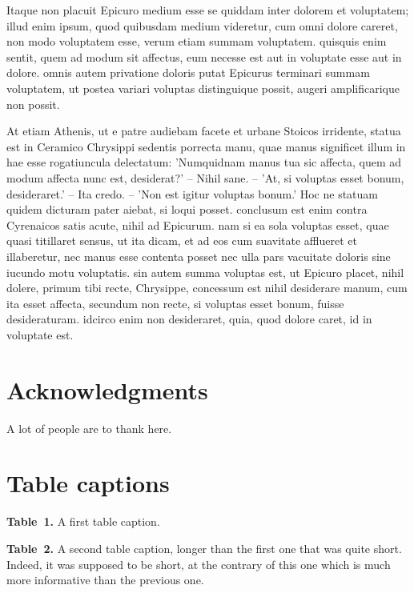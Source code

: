 \documentclass[a4paper,11pt,twoside]{article}
\begin{document}
Itaque non placuit Epicuro medium esse se quiddam inter dolorem et voluptatem; illud enim
ipsum, quod quibusdam medium videretur, cum omni dolore careret, non modo voluptatem esse,
verum etiam summam voluptatem. quisquis enim sentit, quem ad modum sit affectus, eum
necesse est aut in voluptate esse aut in dolore. omnis autem privatione doloris putat
Epicurus terminari summam voluptatem, ut postea variari voluptas distinguique possit,
augeri amplificarique non possit.

At etiam Athenis, ut e patre audiebam facete et urbane Stoicos irridente, statua est in
Ceramico Chrysippi sedentis porrecta manu, quae manus significet illum in hae esse
rogatiuncula delectatum: 'Numquidnam manus tua sic affecta, quem ad modum affecta nunc
est, desiderat?' -- Nihil sane. -- 'At, si voluptas esset bonum, desideraret.' -- Ita
credo. -- 'Non est igitur voluptas bonum.' Hoc ne statuam quidem dicturam pater aiebat, si
loqui posset. conclusum est enim contra Cyrenaicos satis acute, nihil ad Epicurum. nam si
ea sola voluptas esset, quae quasi titillaret sensus, ut ita dicam, et ad eos cum
suavitate afflueret et illaberetur, nec manus esse contenta posset nec ulla pars vacuitate
doloris sine iucundo motu voluptatis. sin autem summa voluptas est, ut Epicuro placet,
nihil dolere, primum tibi recte, Chrysippe, concessum est nihil desiderare manum, cum ita
esset affecta, secundum non recte, si voluptas esset bonum, fuisse desideraturam. idcirco
enim non desideraret, quia, quod dolore caret, id in voluptate est.


\section*{Acknowledgments}

A lot of people are to thank here.


\newpage



\newpage
\section*{Table captions}


\noindent \textbf{Table~1.} A first table caption.

\bigskip

\noindent \textbf{Table~2.} A second table caption, longer than the first one that was
quite short. Indeed, it was supposed to be short, at the contrary of this one which is
much more informative than the previous one.
\end{document}
